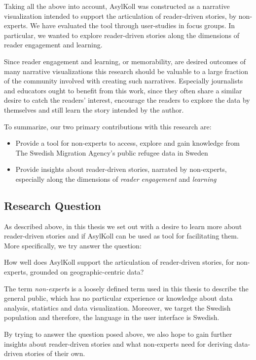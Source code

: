 \documentclass{acmtog} %
\begin{document}
Taking all the above into account, AsylKoll was constructed as a narrative visualization intended to support the articulation of reader-driven stories, by non-experts. We have evaluated the tool through user-studies in focus groups. In particular, we wanted to explore reader-driven stories along the dimensions of reader engagement and learning.

Since reader engagement and learning, or memorability, are desired outcomes of many narrative visualizations this research should be valuable to a large fraction of the community involved with creating such narratives. Especially journalists and educators ought to benefit from this work, since they often share a similar desire to catch the readers' interest, encourage the readers to explore the data by themselves and still learn the story intended by the author. 

To summarize, our two primary contributions with this research are:
\begin{itemize}
\item Provide a tool for non-experts to access, explore and gain knowledge from The Swedish Migration Agency's public refugee data in Sweden
\item Provide insights about reader-driven stories, narrated by non-experts, especially along the dimensions of \emph{reader engagement} and \emph{learning}
\end{itemize}

\subsection{Research Question}
\label{sub:rq}
As described above, in this thesis we set out with a desire to learn more about reader-driven stories and if AsylKoll can be used as tool for facilitating them. More specifically, we try answer the question: 

\begin{displayquote}
How well does AsylKoll support the articulation of reader-driven stories, for non-experts, grounded on geographic-centric data?
\end{displayquote}
The term \emph{non-experts} is a loosely defined term used in this thesis to describe the general public, which has no particular experience or knowledge about data analysis, statistics and data visualization. Moreover, we target the Swedish population and therefore, the language in the user interface is Swedish. 

By trying to answer the question posed above, we also hope to gain further insights about reader-driven stories and what non-experts need for deriving data-driven stories of their own.
\end{document}
